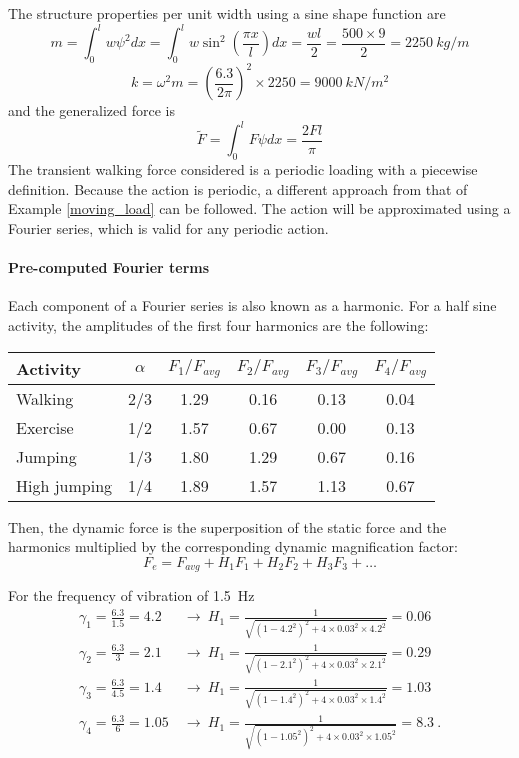 \begin{Answer}[ref={footfall_analysis}]
The structure properties per unit width using a sine shape function are
$$
m = \int_{0}^{l}w\psi^2dx = \int_{0}^{l}w\sin^2\left(\frac{\pi x}{l}\right)dx = \frac{wl}{2} = \frac{500\times9}{2} = \SI{2250}{kg/m}
$$
$$
k = \omega^2m = \left(\frac{6.3}{2\pi}\right)^2\times2250 = \SI{9000}{kN/m^2}
$$
and the generalized force is
$$
\tilde{F} = \int_{0}^{l}F\psi dx = \frac{2Fl}{\pi}
$$
The transient walking force considered is a periodic loading with a piecewise definition. Because the action is periodic, a different approach from that of Example \ref{moving_load} can be followed. The action will be approximated using a Fourier series, which is valid for any periodic action.

\paragraph{Pre-computed Fourier terms}

Each component of a Fourier series is also known as a harmonic. For a half sine activity, the amplitudes of the first four harmonics are the following:

\begin{center}
\begin{tabular}{|l|c|cccc|}
    \hline
    Activity & $\alpha$ & $F_1/F_{avg}$ & $F_2/F_{avg}$ & $F_3/F_{avg}$ & $F_4/F_{avg}$ \\ \hline
    Walking  &    2/3   &   1.29   &   0.16   &   0.13   &   0.04   \\
    Exercise &    1/2   &   1.57   &   0.67   &   0.00   &   0.13   \\
    Jumping  &    1/3   &   1.80   &   1.29   &   0.67   &   0.16   \\
    High jumping & 1/4  &   1.89   &   1.57   &   1.13   &   0.67   \\ \hline
\end{tabular}
\end{center}
Then, the dynamic force is the superposition of the static force and the harmonics multiplied by the corresponding dynamic magnification factor:
$$
F_e = F_{avg} + H_1F_1 + H_2F_2 + H_3F_3 + \dots
$$

For the frequency of vibration of \qty{1.5}{Hz}
\begin{align*}
\gamma_1 = \frac{6.3}{1.5} = 4.2\ &\rightarrow\ H_1 = \frac{1}{\sqrt{(1-4.2^2)^2 + 4\times0.03^2\times4.2^2}} = 0.06\\
\gamma_2 = \frac{6.3}{3}   = 2.1\ &\rightarrow\ H_1 = \frac{1}{\sqrt{(1-2.1^2)^2 + 4\times0.03^2\times2.1^2}} = 0.29\\
\gamma_3 = \frac{6.3}{4.5} = 1.4\ &\rightarrow\ H_1 = \frac{1}{\sqrt{(1-1.4^2)^2 + 4\times0.03^2\times1.4^2}} = 1.03\\
\gamma_4 = \frac{6.3}{6}   = 1.05\ &\rightarrow\ H_1 = \frac{1}{\sqrt{(1-1.05^2)^2 + 4\times0.03^2\times1.05^2}} = 8.3\ .
\end{align*}


\end{Answer}
